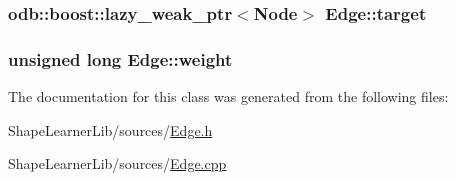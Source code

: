 \subsubsection[{target}]{\setlength{\rightskip}{0pt plus 5cm}odb\+::boost\+::lazy\+\_\+weak\+\_\+ptr$<${\bf Node}$>$ Edge\+::target\hspace{0.3cm}{\ttfamily [private]}}\label{class_edge_a93b220a32293b3140f0f51c6cbd5ecc2}
\hypertarget{class_edge_adb8d89100ecda64789056b98809e0324}{}
\subsubsection[{weight}]{\setlength{\rightskip}{0pt plus 5cm}unsigned long Edge\+::weight\hspace{0.3cm}{\ttfamily [private]}}\label{class_edge_adb8d89100ecda64789056b98809e0324}


The documentation for this class was generated from the following files\+:\begin{DoxyCompactItemize}
\item 
Shape\+Learner\+Lib/sources/\hyperlink{_edge_8h}{Edge.\+h}\item 
Shape\+Learner\+Lib/sources/\hyperlink{_edge_8cpp}{Edge.\+cpp}\end{DoxyCompactItemize}
